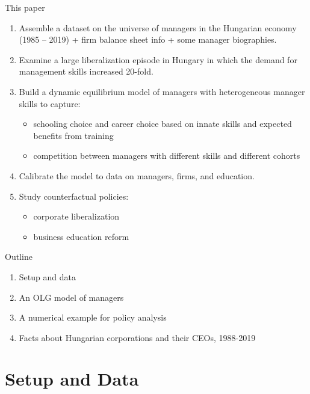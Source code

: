 \documentclass[
  ignorenonframetext,
  aspectratio=1610,
]{beamer}
\providecommand{\tightlist}{%
  \setlength{\itemsep}{0pt}\setlength{\parskip}{0pt}}
\begin{document}
\begin{frame}{This paper}
\protect\hypertarget{this-paper}{}
\begin{enumerate}
\tightlist
\item
  Assemble a dataset on the universe of managers in the Hungarian
  economy (1985 -- 2019) + firm balance sheet info + some manager
  biographies.
\item
  Examine a large liberalization episode in Hungary in which the demand
  for management skills increased 20-fold.
\item
  Build a dynamic equilibrium model of managers with heterogeneous
  manager skills to capture:

  \begin{itemize}
  \tightlist
  \item
    schooling choice and career choice based on innate skills and
    expected benefits from training
  \item
    competition between managers with different skills and different
    cohorts
  \end{itemize}
\item
  Calibrate the model to data on managers, firms, and education.
\item
  Study counterfactual policies:

  \begin{itemize}
  \tightlist
  \item
    corporate liberalization
  \item
    business education reform
  \end{itemize}
\end{enumerate}
\end{frame}

\begin{frame}{Outline}
\protect\hypertarget{outline}{}
\begin{enumerate}
\tightlist
\item
  Setup and data
\item
  An OLG model of managers
\item
  A numerical example for policy analysis
\item
  Facts about Hungarian corporations and their CEOs, 1988-2019
\end{enumerate}
\end{frame}

\section{Setup and Data}\label{setup-and-data}
\end{document}
